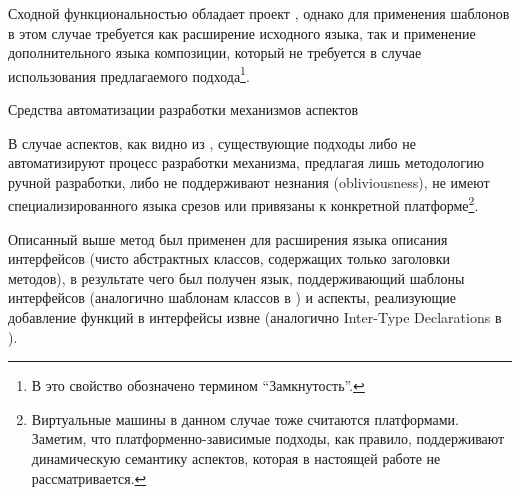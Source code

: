 Сходной функциональностью обладает проект , однако для применения шаблонов в этом случае требуется как расширение исходного языка, так и применение дополнительного языка композиции, который не требуется в случае использования предлагаемого подхода\footnote{В  это свойство обозначено термином ``Замкнутость''.}.

\begin{table}[htb]
	\centering
\newcommand{\dissonly}[1]{}

	\caption{Средства автоматизации разработки механизмов аспектов}\label{AspTable}
\end{table}

В случае аспектов, как видно из , существующие подходы либо не автоматизируют процесс разработки механизма, предлагая лишь методологию ручной разработки, либо не поддерживают незнания (obliviousness), не имеют специализированного языка срезов или привязаны к конкретной платформе\footnote{ Виртуальные машины в данном случае тоже считаются платформами. Заметим, что платформенно-зависимые подходы, как правило, поддерживают динамическую семантику аспектов, которая в настоящей работе не рассматривается.}. 

Описанный выше метод был применен для расширения языка описания интерфейсов (чисто абстрактных классов, содержащих только заголовки методов), в результате чего был получен язык, поддерживающий шаблоны интерфейсов (аналогично шаблонам классов в ) и аспекты, реализующие добавление функций в интерфейсы извне (аналогично Inter-Type Declarations в ).